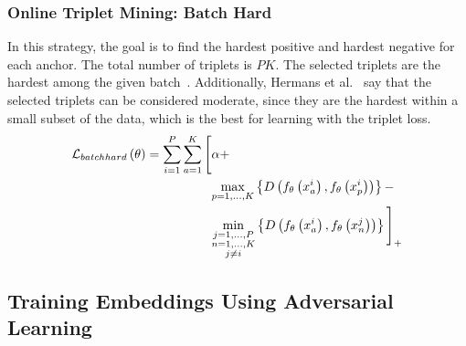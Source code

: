 \subsubsection{Online Triplet Mining: Batch Hard}

In this strategy, the goal is to find the hardest positive and hardest negative for each anchor. The total number of triplets is $PK$. The selected triplets are the hardest among the given batch~\cite{hermans2017triplet}. Additionally, Hermans et al.~\cite{hermans2017triplet} say that the selected triplets can be considered moderate, since they are the hardest within a small subset of the data, which is the best for learning with the triplet loss.
\begin{equation}
    \begin{aligned}
        {\mathcal{L}_{batchhard}} \left( \theta \right) =
        \sum_{i = 1}^P
        \sum_{a = 1}^K
        \Bigg[
            &\alpha +\\
            &\underset{p = 1, \dots, K} {\max}
            \left\{ {
                {D} \left( 
                    {f_\theta} \left( x_a^i \right),
                    {f_\theta} \left( x_p^i \right)
                 \right)
            } \right\} -\\
            &\underset{\substack{j = 1, \dots, P\\n = 1, \dots, K\\j \neq i}} {\min}
            \left\{ {
                {D} \left( 
                    {f_\theta} \left( x_a^i \right),
                    {f_\theta} \left( x_n^j \right)
                 \right)
            } \right\}
        {\Bigg]}_{+}
    \end{aligned}
\end{equation}

\subsection{Training Embeddings Using Adversarial Learning}
\label{ssec:TrainingEmbeddingsAdversarialLearning}

